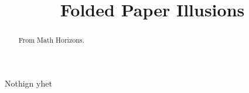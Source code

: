 \documentclass{ximera}
\title{Folded Paper Illusions}
\begin{document}
\begin{abstract}
From Math Horizons.
\end{abstract}
\maketitle


Nothign yhet
\end{document}
